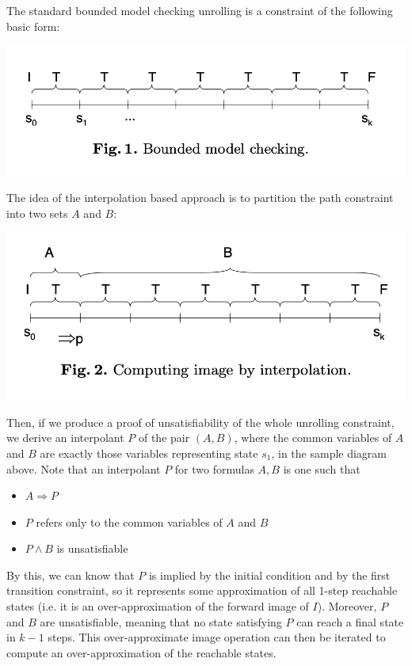 \documentclass[10pt,a4paper]{article}
\begin{document}
The standard bounded model checking unrolling is a constraint of the following basic form:
\begin{center}
    \includegraphics[scale=0.38]{images/bmc.png}
\end{center}
The idea of the interpolation based approach is to partition the path constraint into two sets $A$ and $B$:
\begin{center}
    \includegraphics[scale=0.38]{images/bmc-interpolant.png}   
\end{center}
Then, if we produce a proof of unsatisfiability of the whole unrolling constraint, we derive an interpolant $P$ of the pair $(A,B)$, where the common variables of $A$ and $B$ are exactly those variables representing state $s_1$, in the sample diagram above. Note that an interpolant $P$ for two formulas $A,B$ is one such that 
\begin{itemize}
    \item $A \Rightarrow P$
    \item $P$ refers only to the common variables of $A$ and $B$
    \item $P \wedge B$ is unsatisfiable
\end{itemize}

By this, we can know that $P$ is implied by the initial condition and by the first transition constraint, so it represents some approximation of all 1-step reachable states (i.e. it is an over-approximation of the forward image of $I$). Moreover, $P$ and $B$ are unsatisfiable, meaning that no state satisfying $P$ can reach a final state in $k-1$ steps. This over-approximate image operation can then be iterated to compute an over-approximation of the reachable states. 



\end{document}
